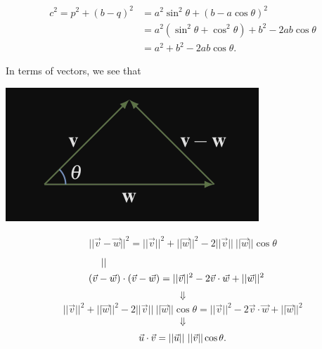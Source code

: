 \documentclass[pdf,9pt]{beamer}
\begin{document}
{\begin{frame}[fragile]
\begin{proofnoend}
\begin{center}
   \end{center}
   \begin{align*}
     c^2 = p^2 +\left(b-q\right)^2 &= a^2 \sin^2\theta + \left(b-a\cos\theta\right)^2\\
                                   &= a^2 \left(\sin^2\theta+ \cos^2\theta\right) + b^2 -2ab\cos\theta\\
                                   &= a^2 +b^2 -2ab\cos\theta.
   \end{align*}
 \end{proofnoend}
\end{frame}
\begin{frame}[fragile]
    \begin{proofnoend}[continued]
   In terms of vectors, we see that
   \begin{center}
     \includegraphics[scale=0.25]{./figures/InnerProduct.png}
   \end{center}
   \begin{align*}
     ||\vec{v} -\vec{w}||^2 = ||\vec{v}||^2 + ||\vec{w}||^2 - 2 ||\vec{v}||\: ||\vec{w}|| \cos \theta
   \end{align*}
   \vspace{-3em}
   \pause
   \begin{align*}
       || & \\
	  &\hspace{-2em}\left(\vec{v}-\vec{w}\right) \cdot \left(\vec{v}-\vec{w}\right) = ||\vec{v}||^2 - 2 \vec{v}\cdot \vec{w} + ||\vec{w}||^2
   \end{align*}
   \vspace{-2em}
   \pause
   \[\Downarrow\]
   \vspace{-2em}
    \begin{align*}
	||\vec{v}||^2 + ||\vec{w}||^2 - 2 ||\vec{v}||\: ||\vec{w}|| \cos \theta  = ||\vec{v}||^2 - 2 \vec{v}\cdot \vec{w} + ||\vec{w}||^2
    \end{align*}
   \vspace{-2em}
   \[\Downarrow\]
   \vspace{-1.5em}
    \pause
    \[ \vec{u}\dotprod\vec{v} = ||\vec{u}||~||\vec{v}||\cos\theta.\]
    \myQED
 \end{proofnoend}
\end{frame}
\frame{
\[ \vec{u}\dotprod\vec{v} = ||\vec{u}||~||\vec{v}||\cos\theta.\]
\smallskip

}}
\end{document}
